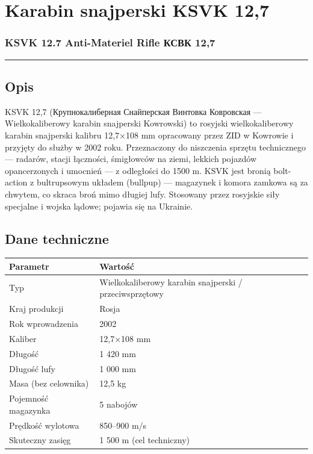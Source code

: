 \documentclass[12pt,openany,oneside]{book}
\begin{document}
\chapter{Karabin snajperski KSVK
12,7}\label{karabin-snajperski-ksvk-127}

\subsection{KSVK 12.7 Anti-Materiel Rifle \textbar{} КСВК
12,7}\label{ksvk-12.7-anti-materiel-rifle-ux43aux441ux432ux43a-127}

\begin{center}\rule{0.5\linewidth}{0.5pt}\end{center}

\section{Opis}\label{opis-65}

KSVK 12,7 (Крупнокалиберная Снайперская Винтовка Ковровская ---
Wielkokaliberowy karabin snajperski Kowrowski) to rosyjski
wielkokaliberowy karabin snajperski kalibru 12,7×108 mm opracowany przez
ZID w Kowrowie i przyjęty do służby w 2002 roku. Przeznaczony do
niszczenia sprzętu technicznego --- radarów, stacji łączności,
śmigłowców na ziemi, lekkich pojazdów opancerzonych i umocnień --- z
odległości do 1500 m. KSVK jest bronią bolt-action z bultrupsowym
układem (bullpup) --- magazynek i komora zamkowa są za chwytem, co
skraca broń mimo długiej lufy. Stosowany przez rosyjskie siły specjalne
i wojska lądowe; pojawia się na Ukrainie.

\section{Dane techniczne}\label{dane-techniczne-65}

\begin{longtable}[]{@{}ll@{}}
\toprule\noalign{}
Parametr & Wartość \\
\midrule\noalign{}
\endhead
\bottomrule\noalign{}
\endlastfoot
Typ & Wielkokaliberowy karabin snajperski / przeciwsprzętowy \\
Kraj produkcji & Rosja \\
Rok wprowadzenia & 2002 \\
Kaliber & 12,7×108 mm \\
Długość & 1 420 mm \\
Długość lufy & 1 000 mm \\
Masa (bez celownika) & 12,5 kg \\
Pojemność magazynka & 5 nabojów \\
Prędkość wylotowa & 850--900 m/s \\
Skuteczny zasięg & 1 500 m (cel techniczny) \\
\end{longtable}
\end{document}
